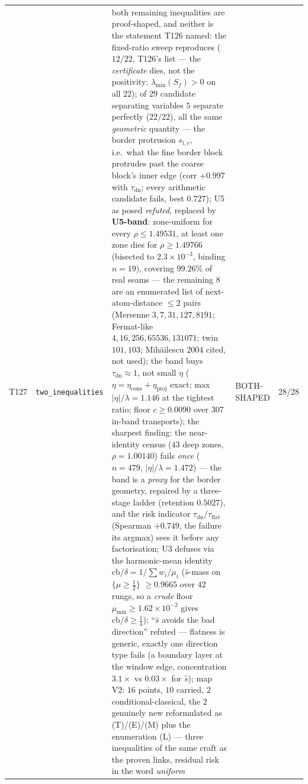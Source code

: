 \documentclass[11pt,a4paper]{article}
\begin{document}
{\begin{xltabular}{\linewidth}{@{}p{0.95cm} >{\raggedright\arraybackslash}p{3.1cm} Y >{\raggedright\scriptsize\arraybackslash}p{3.35cm} p{1.15cm}@{}}
T127 & \texttt{\scriptsize two\_\allowbreak inequalities} & both remaining inequalities are proof-shaped, and neither is the statement T126 named: the fixed-ratio sweep reproduces ($12/22$, T126's list --- the \emph{certificate} dies, not the positivity: $\lambda_{\min}(S_f)>0$ on all $22$); of $29$ candidate separating variables $5$ separate perfectly ($22/22$), all the same \emph{geometric} quantity --- the border protrusion $s_{l,r}$, i.e.\ what the fine border block protrudes past the coarse block's inner edge (corr $+0.997$ with $\tau_{\mathrm{dn}}$; every arithmetic candidate fails, best $0.727$); U5 as posed \emph{refuted}, replaced by \textbf{U5-band}: zone-uniform for every $\rho\le1.49531$, at least one zone dies for $\rho\ge1.49766$ (bisected to $2.3\times10^{-3}$, binding $n=19$), covering $99.26\%$ of real seams --- the remaining $8$ are an enumerated list of next-atom-distance $\le2$ pairs (Mersenne $3,7,31,127,8191$; Fermat-like $4,16,256,65536,131071$; twin $101,103$; Mih\u{a}ilescu 2004 cited, not used); the band buys $\tau_{\mathrm{dn}}\approx1$, not small $\eta$ ($\eta=\eta_{\mathrm{cons}}+\eta_{\mathrm{proj}}$ exact; max $|\eta|/\lambda=1.146$ at the tightest ratio; floor $c\ge0.0090$ over $307$ in-band transports); the sharpest finding: the near-identity census ($43$ deep zones, $\rho=1.00140$) fails \emph{once} ($n=479$, $|\eta|/\lambda=1.472$) --- the band is a \emph{proxy} for the border geometry, repaired by a three-stage ladder (retention $0.5027$), and the risk indicator $\tau_{\mathrm{dn}}/\tau_{\mathrm{flat}}$ (Spearman $+0.749$, the failure its argmax) sees it before any factorisation; U3 defuses via the harmonic-mean identity $\mathrm{cb}/\delta=1/\sum w_i/\mu_i$ ($\hat s$-mass on $\{\mu\ge\tfrac12\}$ $\ge0.9665$ over $42$ rungs, so a \emph{crude} floor $\mu_{\min}\ge1.62\times10^{-2}$ gives $\mathrm{cb}/\delta\ge\tfrac14$); ``$\hat s$ avoids the bad direction'' refuted --- flatness is generic, exactly one direction type fails (a boundary layer at the window edge, concentration $3.1\times$ vs $0.03\times$ for $\hat s$); map V2: $16$ points, $10$ carried, $2$ conditional-classical, the $2$ genuinely new reformulated as (T)/(E)/(M) plus the enumeration (L) --- three inequalities of the same craft as the proven links, residual risk in the word \emph{uniform} & BOTH-SHAPED & 28/28\\

\end{xltabular}}
\end{document}
